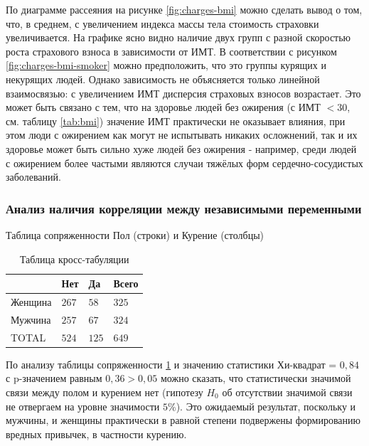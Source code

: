 \documentclass[a4paper,12pt]{article}
\begin{document}
По диаграмме рассеяния на рисунке \ref{fig:charges-bmi} можно сделать вывод о том, что, в среднем, с увеличением индекса массы тела стоимость страховки увеличивается. На графике ясно видно наличие двух групп с разной скоростью роста страхового взноса в зависимости от ИМТ. В соответствии с рисунком \ref{fig:charges-bmi-smoker} можно предположить, что это группы курящих и некурящих людей. Однако зависимость не объясняется только линейной взаимосвязью: с увеличением ИМТ дисперсия страховых взносов возрастает. Это может быть связано с тем, что на здоровье людей без ожирения (с ИМТ $<30$, см. таблицу \ref{tab:bmi}) значение ИМТ практически не оказывает влияния, при этом люди с ожирением как могут не испытывать никаких осложнений, так и их здоровье может быть сильно хуже людей без ожирения - например, среди людей с ожирением более частыми являются случаи тяжёлых форм сердечно-сосудистых заболеваний.

\subsubsection{Анализ наличия корреляции между независимыми переменными}

\begin{table}[H]
	\begin{center}
		Таблица сопряженности Пол (строки) и Курение (столбцы)\\
		
		\vspace{8pt}
		
		\begin{tabular}{|l|l|l|l|}
			\hline
		    & Нет & Да & Всего \\[1ex]
		    \hline
			Женщина & $267$ & $58$ & $325$\\
			\hline
			Мужчина & $257$ & $67$ & $324$\\[1ex]
			\hline
			TOTAL & $524$ & $125$ & $649$\\
			\hline
		\end{tabular}
		\caption{Таблица кросс-табуляции}
		\label{tab:cross}
	\end{center}
\end{table}

По анализу таблицы сопряженности \ref{tab:cross} и значению статистики Хи-квадрат = $0,84$ с p-значением равным $0,36 > 0,05$ можно сказать, что статистически значимой связи между полом и курением нет (гипотезу $H_0$ об отсутствии значимой связи не отвергаем на уровне значимости $5\%$). Это ожидаемый результат, поскольку и мужчины, и женщины практически в равной степени подвержены формированию вредных привычек, в частности курению.
\end{document}

